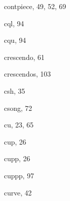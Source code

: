 \begin{theindex}
  \item {\Bslash contpiece}, 49, 52, 69
  \item {\Bslash cql}, 94
  \item {\Bslash cqu}, 94
  \item {\Bslash crescendo}, 61
  \item crescendos, 103
  \item {\Bslash csh}, 35
  \item {\Bslash csong}, 72
  \item {\Bslash cu}, 23, 65
  \item {\Bslash cup}, 26
  \item {\Bslash cupp}, 26
  \item {\Bslash cuppp}, 97
  \item {\Bslash curve}, 42

  \indexspace


\end{theindex}
